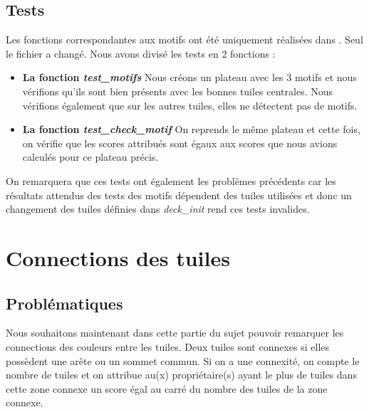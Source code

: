 \documentclass[a4paper]{article}
\begin{document}
\subsection{Tests}

Les fonctions correspondantes aux motifs ont été uniquement réalisées dans . Seul le fichier  a changé. Nous avons divisé les tests en 2 fonctions : \\
\begin{itemize}
\item \textbf{La fonction \emph{test\_motifs}}
  Nous créons un plateau avec les 3 motifs et nous vérifions qu'ils sont bien présents avec les bonnes tuiles centrales. Nous vérifions également que sur les autres tuiles, elles ne détectent pas de motifs.
\item \textbf{La fonction \emph{test\_check\_motif}}
  On reprends le même plateau et cette fois, on vérifie que les scores attribués sont égaux aux scores que nous avions calculés pour ce plateau précis. \\
\end{itemize}
On remarquera que ces tests ont également les problèmes précédents car les résultats attendus des tests des motifs dépendent des tuiles utilisées et donc un changement des tuiles définies dans \emph{deck\_init} rend ces tests invalides.

\newpage

\section{Connections des tuiles}
\subsection{Problématiques}
Nous souhaitons maintenant dans cette partie du sujet pouvoir remarquer les connections des couleurs entre les tuiles. Deux tuiles sont connexes si elles possèdent une arête ou un sommet commun. Si on a une connexité, on compte le nombre de tuiles et on attribue au(x) propriétaire(s) ayant le plus de tuiles dans cette zone connexe un score égal au carré du nombre des tuiles de la zone connexe. 
\end{document}

